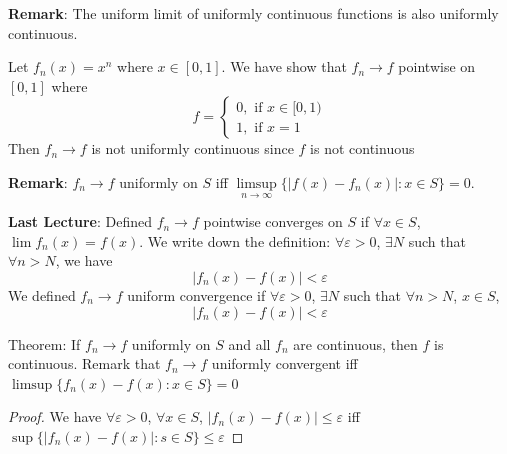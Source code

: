 \documentclass{report}
\begin{document}
\textbf{Remark}: The uniform limit of uniformly continuous functions is also uniformly continuous.

\begin{examples}
    \begin{example}
        Let $f_{n}(x) = x^{n}$ where $x \in[0, 1]$. We have show that $f_{n} \rightarrow f$ pointwise on $[0, 1]$ where
            \begin{equation*}
                f = \begin{cases}
                    0, \text{ if } x \in[0, 1) \\
                    1, \text{ if } x = 1
                \end{cases}
            \end{equation*}
        Then $f_{n} \rightarrow f$ is not uniformly continuous since $f$ is not continuous
    \end{example}
\end{examples}

\textbf{Remark}: $f_{n} \rightarrow f$ uniformly on $S$ iff $\limsup\limits_{n \to \infty} \{\lvert f(x) - f_{n}(x) \rvert : x \in S\} = 0$.

\textbf{Last Lecture}: Defined $f_{n} \rightarrow f$ pointwise converges on $S$ if $\forall x \in S$, $\lim f_{n}(x) = f(x)$. We write down the definition: $\forall \varepsilon> 0$, $\exists N$ such that $\forall n > N$, we have
    \begin{equation*}
        \lvert f_{n}(x) - f(x) \rvert <  \varepsilon
    \end{equation*}
We defined $f_{n} \rightarrow f$ uniform convergence if $\forall \varepsilon> 0$, $\exists N$ such that $\forall n> N$, $x \in S$, 
    \begin{equation*}
        \lvert f_{n}(x) - f(x) \rvert < \varepsilon
    \end{equation*}

Theorem: If $f_{n} \rightarrow f$ uniformly on $S$ and all $f_{n}$ are continuous, then $f$ is continuous. Remark that $f_{n} \rightarrow f$ uniformly convergent iff $\limsup \{f_{n}(x) - f(x): x\in S\}  = 0$
    \begin{proof}
        We have $\forall \varepsilon> 0$, $\forall x \in S$, $\lvert f_{n}(x) - f(x)  \rvert \leq \varepsilon$ iff $\sup \{\lvert f_{n}(x) - f(x) \rvert : s \in S\} \leq \varepsilon$
    \end{proof}
\end{document}
